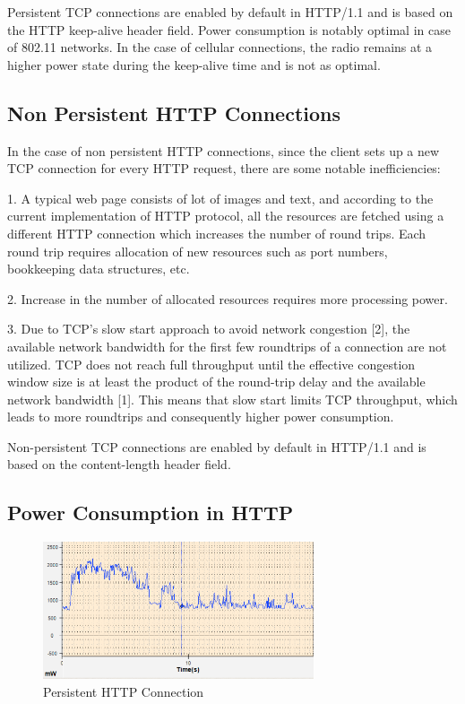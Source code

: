 \documentclass{sigplanconf}
\begin{document}
Persistent TCP connections are enabled by default in HTTP/1.1 and is based on the HTTP keep-alive header field. Power consumption is notably optimal in case of 802.11 networks. In the case of cellular connections, the radio remains at a higher power state during the keep-alive time and is not as optimal.
\subsection{ Non Persistent HTTP Connections}


In the case of non persistent HTTP connections, since the client sets up a new TCP connection for every HTTP request, there are some notable inefficiencies: 

1. A typical web page consists of lot of images and text, and according to the current implementation of HTTP protocol, all the resources are fetched using a different HTTP connection which increases the number of round trips. Each round trip requires allocation of new resources such as port numbers, bookkeeping data structures, etc.

2. Increase in the number of allocated resources requires more processing power.

3. Due to TCP’s slow start approach to avoid network congestion [2], the available network bandwidth for the first few roundtrips of a connection are not utilized. TCP does not reach full throughput until the effective congestion window size is at least the product of the round-trip delay and the available network bandwidth [1]. This means that slow start limits TCP throughput, which leads to more roundtrips and consequently higher power consumption.

Non-persistent TCP connections are enabled by default in HTTP/1.1 and is based on the content-length header field.


\subsection{Power Consumption in HTTP}


\begin{figure}[ht!]
\centering
\includegraphics[width=80mm]{powerconsumption1.png}
\caption{Persistent HTTP Connection }
\label{fig:sp_gd_mnist}
\end{figure}
\end{document}

